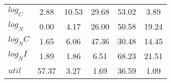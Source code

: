 \begin{center}
\begin{longtable}{lccccc}
$log_C         $	 & 	        2.88	 & 	       10.53	 & 	       29.68	 & 	       53.02	 & 	        3.89 \\ 
$log_N         $	 & 	        0.00	 & 	        4.17	 & 	       26.00	 & 	       50.58	 & 	       19.24 \\ 
$log_NC        $	 & 	        1.65	 & 	        6.06	 & 	       47.36	 & 	       30.48	 & 	       14.45 \\ 
$log_NI        $	 & 	        1.89	 & 	        1.86	 & 	        6.51	 & 	       68.23	 & 	       21.51 \\ 
$util          $	 & 	       57.37	 & 	        3.27	 & 	        1.69	 & 	       36.59	 & 	        1.09 \\ 
\end{longtable}
 \end{center}
